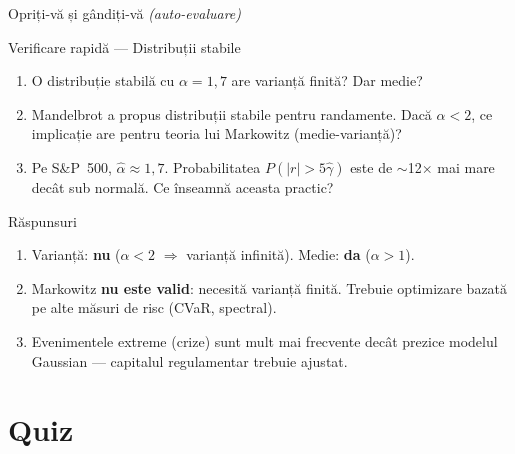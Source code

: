 \documentclass[9pt, aspectratio=169, t]{beamer}
\theoremstyle{definition}
\begin{document}
\begin{frame}{Opriți-vă și gândiți-vă \hfill {\normalsize\textcolor{MediumGray}{\textit{(auto-evaluare)}}}}
\begin{alertblock}{Verificare rapidă --- Distribuții stabile}
\begin{enumerate}\setlength\itemsep{4pt}
\item O distribuție stabilă cu $\alpha = 1{,}7$ are varianță finită? Dar medie?
\item Mandelbrot a propus distribuții stabile pentru randamente. Dacă $\alpha < 2$, ce implicație are pentru teoria lui Markowitz (medie-varianță)?
\item Pe S\&P~500, $\hat{\alpha} \approx 1{,}7$. Probabilitatea $P(|r| > 5\hat{\gamma})$ este de $\sim$12$\times$ mai mare decât sub normală. Ce înseamnă aceasta practic?
\end{enumerate}
\end{alertblock}
\vspace{0.1cm}
\begin{exampleblock}{Răspunsuri}
\begin{enumerate}\setlength\itemsep{0pt}
\item Varianță: \textbf{nu} ($\alpha < 2$ $\Rightarrow$ varianță infinită). Medie: \textbf{da} ($\alpha > 1$).
\item Markowitz \textbf{nu este valid}: necesită varianță finită. Trebuie optimizare bazată pe alte măsuri de risc (CVaR, spectral).
\item Evenimentele extreme (crize) sunt mult mai frecvente decât prezice modelul Gaussian --- capitalul regulamentar trebuie ajustat.
\end{enumerate}
\end{exampleblock}
\end{frame}

\section{Quiz}
\end{document}
